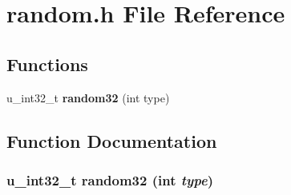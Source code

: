 \section{random.h File Reference}
\label{random_8h}
\subsection*{Functions}
\begin{CompactItemize}
\item 
u\_\-int32\_\-t {\bf random32} (int type)
\end{CompactItemize}


\subsection{Function Documentation}
\subsubsection{\setlength{\rightskip}{0pt plus 5cm}u\_\-int32\_\-t random32 (int {\em type})}\label{random_8h_a0}


